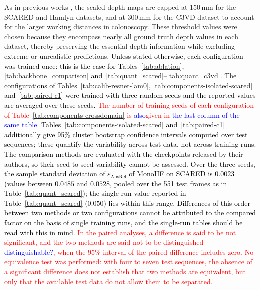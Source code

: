 \documentclass[a4paper,fleqn]{cas-dc}
\begin{document}
As in previous works \citep{Godard_ICCV_2019,Ozyoruk_MIA_2021,Shao_MIA_2022}, the scaled depth maps are capped at 150\,mm for the SCARED and Hamlyn datasets, and at 300\,mm for the C3VD dataset to account for the larger working distances in colonoscopy. These threshold values were chosen because they encompass nearly all ground truth depth values in each dataset, thereby preserving the essential depth information while excluding extreme or unrealistic predictions.
\textcolor{black}
{
Unless stated otherwise, each configuration was trained once: this is the case for
Tables~\ref{tab:ablation}, \ref{tab:backbone_comparison} and~\ref{tab:quant_scared}--\ref{tab:quant_c3vd}.
The configurations of Tables~\ref{tab:calib-resnet-lam0}, \ref{tab:components-isolated-scared}
and~\ref{tab:paired-c1} were trained with three random seeds and the reported values are averaged over these seeds. \textcolor{red}{The number of training seeds of each configuration of Table~\ref{tab:components-crossdomain} is \textcolor{blue}{also}given in \textcolor{blue}{the last column of the same table}.} Tables~\ref{tab:components-isolated-scared} and~\ref{tab:paired-c1} additionally
give 95\% cluster bootstrap confidence intervals computed over test sequences; these quantify the
variability across test data, not across training runs. The comparison methods are evaluated with
the checkpoints released by their authors, so their seed-to-seed variability cannot be assessed.
Over the three seeds, the sample standard deviation of $\varepsilon_\textrm{AbsRel}$ of MonoIIF on
SCARED is $0.0023$ (values between $0.0485$ and $0.0528$, pooled over the 551 test frames as in
Table~\ref{tab:quant_scared}); the single-run value reported in Table~\ref{tab:quant_scared}
($0.050$) lies within this range. Differences of this order between two methods or two
configurations cannot be attributed to the compared factor on the basis of single training runs,
and the single-run tables should be read with this in mind. \textcolor{red}{In the paired analyses, a difference is said to be not significant, and the two methods are said not to be distinguished }\textcolor{blue}{distinguishable?}\textcolor{red}{, when the 95\% interval of the paired difference includes zero. No equivalence test was performed: with four to seven test sequences, the absence of a significant difference does not establish that two methods are equivalent, but only that the available test data do not allow them to be separated.}}
%
\end{document}
